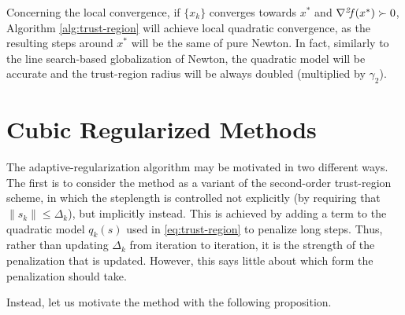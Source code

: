 \documentclass[10pt,a4paper]{article}
\begin{document}
Concerning the local convergence, if $\{x_k\}$ converges towards $x^*$ and $\operatorname*{\mathit{\nabla^2 \!f}}(x^*)\succ0$, Algorithm \ref{alg:trust-region} will achieve local quadratic convergence, as the resulting steps around $x^*$ will be the same of pure Newton. In fact, similarly to the line search-based globalization of Newton, the quadratic model will be accurate and the trust-region radius will be always doubled (multiplied by $\gamma_2$).

\section{Cubic Regularized Methods}
The adaptive-regularization algorithm may be motivated in two different ways. The first
is to consider the method as a variant of the second-order trust-region scheme, in which
the steplength is controlled not explicitly (by requiring that $\|s_k\|\leq \Delta_k$), but implicitly
instead. This is achieved by adding a term to the quadratic model $q_k(s)$ used in \eqref{eq:trust-region} to penalize long steps. Thus, rather than updating $\Delta_k$ from iteration to iteration, it is the strength of the penalization that is updated. However, this says little about which form the penalization should take.
\par Instead, let us motivate the method with the following proposition.
\end{document}

